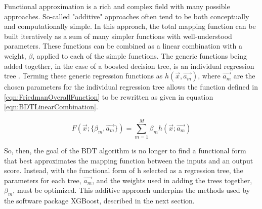 \documentclass[12pt]{ucsddissertation}
\begin{document}
Functional approximation is a rich and complex field with many possible approaches. So-called "additive" approaches often tend to be both conceptually and computationally simple. In this approach, the total mapping function can be built iteratively as a sum of many simpler functions with well-understood parameters. These functions can be combined as a linear combination with a weight, $\beta$, applied to each of the simple functions. The generic functions being added together, in the case of a boosted decision tree, is an individual regression tree \cite{BDTPaper}. Terming these generic regression functions as $h(\vec{x},\vec{a_m})$, where $\vec{a_m}$ are the chosen parameters for the individual regression tree allows the function defined in \ref{eqn:FriedmanOverallFunction} to be rewritten as given in equation \ref{eqn:BDTLinearCombination}.

\begin{equation}\label{eqn:BDTLinearCombination}
    F(\vec{x};\{\beta_m,\vec{a_m}\}) = \sum_{m=1}^{M} \beta_m h(\vec{x};\vec{a_m})
\end{equation}

So, then, the goal of the BDT algorithm is no longer to find a functional form that best approximates the mapping function between the inputs and an output score. Instead, with the functional form of h selected as a regression tree, the parameters for each tree, $\vec{a_m}$, and the weights used in adding the trees together, $\beta_m$, must be optimized. This additive approach underpins the methods used by the software package XGBoost, described in the next section.


\end{document}
